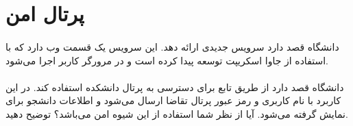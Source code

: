 \documentclass[../main.tex]{subfiles}
\begin{document}
\section{پرتال امن}

\paragraph{}
دانشگاه قصد دارد سرویس جدیدی ارائه دهد.
این سرویس یک قسمت وب دارد که با استفاده از جاوا اسکریپت توسعه پیدا
کرده است و در مرورگر کاربر اجرا می‌شود.

\paragraph{}
دانشگاه قصد دارد از طریق تابع  برای دسترسی به پرتال دانشکده استفاده کند.
در این کاربرد با نام کاربری و رمز عبور پرتال تقاضا ارسال می‌شود و اطلاعات دانشجو برای نمایش گرفته می‌شود.
آیا از نظر شما استفاده از این شیوه امن می‌باشد؟
توضیح دهید.
\end{document}
